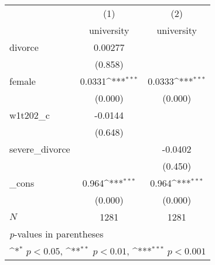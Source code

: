 {
\def\sym#1{\ifmmode^{#1}\else\(^{#1}\)\fi}
\begin{tabular}{l*{2}{c}}
\hline\hline
            &\multicolumn{1}{c}{(1)}&\multicolumn{1}{c}{(2)}\\
            &\multicolumn{1}{c}{university}&\multicolumn{1}{c}{university}\\
\hline
divorce     &     0.00277         &                     \\
            &     (0.858)         &                     \\
[1em]
female      &      0.0331\sym{***}&      0.0333\sym{***}\\
            &     (0.000)         &     (0.000)         \\
[1em]
w1t202\_c    &     -0.0144         &                     \\
            &     (0.648)         &                     \\
[1em]
severe\_divorce&                     &     -0.0402         \\
            &                     &     (0.450)         \\
[1em]
\_cons      &       0.964\sym{***}&       0.964\sym{***}\\
            &     (0.000)         &     (0.000)         \\
\hline
\(N\)       &        1281         &        1281         \\
\hline\hline
\multicolumn{3}{l}{\footnotesize \textit{p}-values in parentheses}\\
\multicolumn{3}{l}{\footnotesize \sym{*} \(p<0.05\), \sym{**} \(p<0.01\), \sym{***} \(p<0.001\)}\\
\end{tabular}
}
